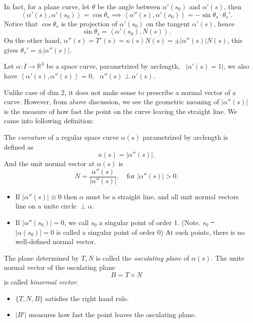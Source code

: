 In fact, for a plane curve, let \(\theta\) be the angle between \(\alpha'(s_0)\) and
\(\alpha'(s)\), then \[
    \left<\alpha'(s),\alpha'(s_0)\right> =\cos\theta_s\implies 
    \left<\alpha''(s),\alpha'(s_0)\right> =-\sin\theta_s\cdot \theta_s'
.\] Notice that \(\cos\theta_s\) is the projection of \(\alpha'(s_0)\) on the tangent
\(\alpha'(s)\), hence \[
    \sin\theta_s=\left<\alpha'(s_0),N(s)\right> 
.\] On the other hand, \(\alpha''(s)=T'(s)=\kappa(s)N(s)=\pm|\alpha''(s)|N(s)\),
this gives \(\theta_s'=\pm|\alpha''(s)|\).


Let \(\alpha\colon I\to \mathbb{R}^3\) be a space curve, parametrized by arclength,
\ie\ \(|\alpha'(s)=1|\), we also have \(\left<\alpha'(s),\alpha''(s)\right> =0\),
\ie\ \(\alpha''(s)\perp\alpha'(s)\).

Unlike case of dim 2, it does not make sense to prescribe a normal vector of
a curve. However, from above discussion, we see the geometric meaning of
\(|\alpha''(s)|\) is the measure of how fast the point on the curve leaving the
straight line. We came into following definition:
\begin{defn}
    The \emph{curvature} of a regular space curve \(\alpha(s)\) parametrized by
    arclength is defined as \[
        \kappa(s)=|\alpha''(s)|
    .\] And the unit normal vector at \(\alpha(s)\) is \[
        N=\frac{\alpha''(s)}{|\alpha''(s)|},\quad\text{for }|\alpha''(s)|>0
    .\] 
\end{defn}
\begin{remark}\hfill
\begin{itemize}
    \item If \(|\alpha''(s)|\equiv 0\) then \(\alpha\) must be a straight line,
        and all unit normal vectors line on a unite circle \(\perp\alpha\).
    \item If \(|\alpha''(s_0)|=0\), we call \(s_0\) a singular point of order 1.
        (Note. \(s_0\) \st\ \(|\alpha(s_0)|=0\) is called a singular point 
        of order 0) At such points, there is no well-defined normal vector.
    \end{itemize}
\end{remark}

\begin{defn}
The plane determined by \(T,N\) is called the \emph{osculating plane} of
\(\alpha(s)\). The unite normal vector of the osculating plane
\[
    B=T\times N
\] is called \emph{binormal vector}.
\end{defn}
\begin{remark}\hfill
\begin{itemize}
    \item \(\{T,N,B\}\) satisfies the right hand rule.
    \item \(|B'|\) measures how fast the point leaves the osculating plane.
\end{itemize}
\end{remark}
